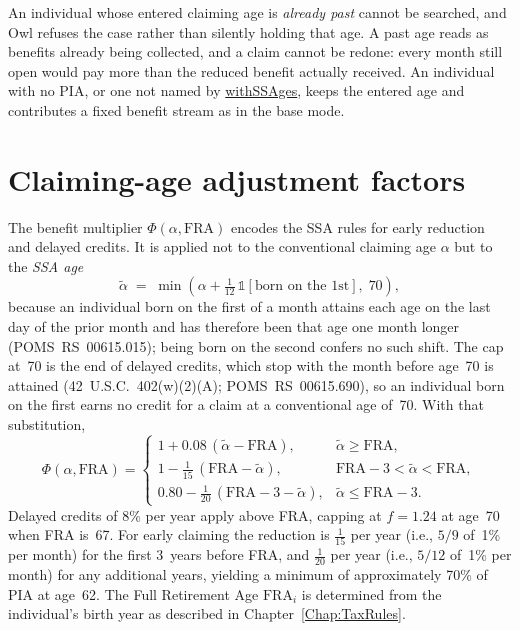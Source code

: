 \documentclass[fleqn,12pt]{report}
\newcommand{\code}[1]{\url{#1}}
\begin{document}
An individual whose entered claiming age is \emph{already past} cannot be
searched, and Owl refuses the case rather than silently holding that age.
A past age reads as benefits already being collected, and a claim cannot be
redone: every month still open would pay more than the reduced benefit actually
received.
An individual with no PIA, or one not named by \code{withSSAges}, keeps the
entered age and contributes a fixed benefit stream as in the base mode.

\section{Claiming-age adjustment factors}
\label{sec:ss-factors}

The benefit multiplier $\Phi(\alpha, \mathrm{FRA})$ encodes the SSA rules for
early reduction and delayed credits.
It is applied not to the conventional claiming age $\alpha$ but to the
\emph{SSA age}
\begin{equation}
    \label{Eq:SSAage}
    \tilde{\alpha} \;=\; \min\!\left(\alpha + \tfrac{1}{12}\,
        \mathbb{1}[\text{born on the 1st}],\; 70\right),
\end{equation}
because an individual born on the first of a month attains each age on the last
day of the prior month and has therefore been that age one month longer
(POMS~RS~00615.015); being born on the second confers no such shift.
The cap at~70 is the end of delayed credits, which stop with the month before
age~70 is attained (42~U.S.C.~402(w)(2)(A); POMS~RS~00615.690), so an individual
born on the first earns no credit for a claim at a conventional age of~70.
With that substitution,
\begin{equation}
    \label{Eq:SelfFactor}
    \Phi(\alpha, \mathrm{FRA}) =
    \begin{cases}
        1 + 0.08\,(\tilde{\alpha} - \mathrm{FRA}), & \tilde{\alpha} \geq \mathrm{FRA}, \\[4pt]
        1 - \tfrac{1}{15}\,(\mathrm{FRA} - \tilde{\alpha}),
            & \mathrm{FRA} - 3 < \tilde{\alpha} < \mathrm{FRA}, \\[6pt]
        0.80 - \tfrac{1}{20}\,(\mathrm{FRA} - 3 - \tilde{\alpha}),
            & \tilde{\alpha} \leq \mathrm{FRA} - 3.
    \end{cases}
\end{equation}
Delayed credits of 8\% per year apply above FRA, capping at
$f = 1.24$ at age~70 when FRA is~67.
For early claiming the reduction is $\tfrac{1}{15}$ per year (i.e., $5/9$ of~1\% per month)
for the first 3~years before FRA, and $\tfrac{1}{20}$ per year (i.e., $5/12$ of~1\% per month)
for any additional years, yielding a minimum of approximately 70\% of PIA at age~62.
The Full Retirement Age $\mathrm{FRA}_i$ is determined from the individual's
birth year as described in Chapter~\ref{Chap:TaxRules}.
\end{document}
